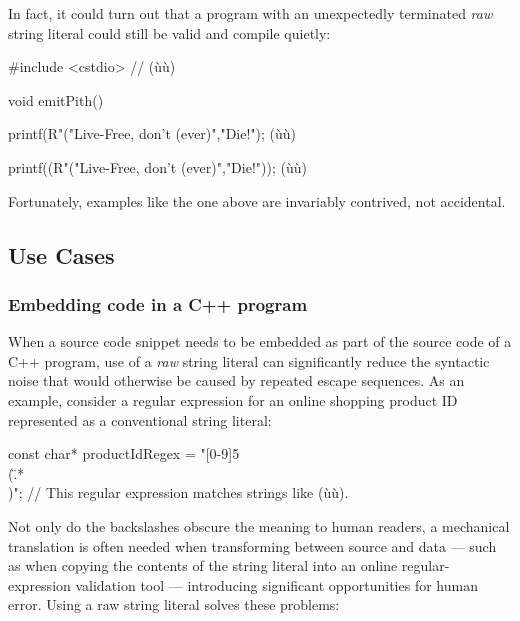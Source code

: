 \noindent In fact, it could turn out that a program with an unexpectedly
terminated \emph{raw} string literal could still be valid and compile
quietly:

\begin{emcppshiddenlisting}[emcppsbatch=e1]
#include <cstdio>   // (ù{}ù)
\end{emcppshiddenlisting}
\begin{emcppslisting}[emcppsbatch=e1]
void emitPith()
{
    printf(R"("Live-Free, don't (ever)","Die!");
        (ù{}ù)

    printf((R"("Live-Free, don't (ever)","Die!"));
        (ù{}ù)
}
\end{emcppslisting}

\noindent Fortunately, examples like the one above are invariably contrived, not
accidental.

\subsection[Use Cases]{Use Cases}\label{use-cases}

\subsubsection[Embedding code in a C++ program]{Embedding code in a C++ program}\label{embedding-code-in-a-c++-program}

When a source code snippet needs to be embedded as part of the source
code of a C++ program, use of a \emph{raw} string literal can
significantly reduce the syntactic noise that would otherwise be caused
by repeated escape sequences. As an example, consider a regular
expression for an online shopping product ID represented as a
conventional string literal:

\begin{emcppslisting}
const char* productIdRegex = "[0-9]{5}\\(\".*\"\\)";
    // This regular expression matches strings like (ù{}ù).
\end{emcppslisting}

\noindent Not only do the backslashes obscure the meaning to human readers, a
mechanical translation is often needed when transforming between source
and data --- such as when copying the contents of the string literal into an online regular-expression validation tool --- introducing significant opportunities for human error. Using a
raw string literal solves these problems:

